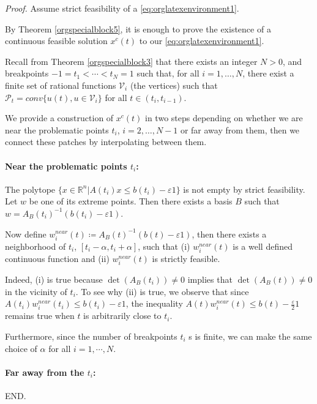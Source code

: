 \documentclass[moor]{informs1}
\renewenvironment{proof}{\emph{Proof.}}{END.}
\begin{document}
\begin{proof}
Assume strict feasibility of a \ref{eq:orglatexenvironment1}.

By Theorem \ref{orgspecialblock5}, it is enough to prove the existence of a continuous feasible solution \(x^c(t)\) to our \ref{eq:orglatexenvironment1}.

Recall from Theorem \ref{orgspecialblock3} that there exists an integer \(N > 0\), and breakpoints \(-1 = t_1 < \cdots < t_N = 1\) such that, for all \(i = 1, \ldots, N\), there exist a finite set of rational functions \(\mathcal V_i\) (the vertices) such that \(\mathcal P_t = conv\{ u(t), u \in \mathcal V_i \}\) for all \(t \in (t_i, t_{i-1})\).

We provide a construction of \(x^c(t)\) in two steps depending on whether we are near the problematic points \(t_i\), \(i = 2, \ldots, N-1\) or far away from them, then we connect these patches by interpolating between them. 

\paragraph{Near the problematic points $t_i$:}

The polytope \(\{x \in \mathbb R^n |  A(t_i)x \le b(t_i) - \varepsilon 1\}\) is not empty by strict feasibility. Let \(w\) be one of its extreme points. Then there exists a basis \(B\) such that \(w = A_B(t_i)^{-1}(b(t_i) - \varepsilon 1)\).

Now define \(w_i^{near}(t) \coloneqq A_B(t)^{-1}(b(t) - \varepsilon 1)\), then there exists a neighborhood of \(t_i\), \([t_i-\alpha, t_i+\alpha]\), such that (i) \(w_i^{near}(t)\) is a well defined continuous function and (ii) \(w_i^{near}(t)\) is strictly feasible.

Indeed, (i) is true because  \(\det(A_B(t_i)) \ne 0\) implies that \(\det(A_B(t)) \ne 0\) in the vicinity of \(t_i\). To see why (ii) is true, we observe that since \(A(t_i)w_i^{near}(t_i) \le b(t_i) - \varepsilon 1\), the inequality \(A(t)w_i^{near}(t) \le b(t) - \frac{\varepsilon}2 1\) remains true when \(t\) is arbitrarily close to \(t_i\).

Furthermore, since the number of breakpoints \(t_i\) s is finite, we can make the same choice of \(\alpha\) for all \(i = 1, \cdots, N\).

\paragraph{Far away from the $t_i$:}


\end{proof}
\end{document}
